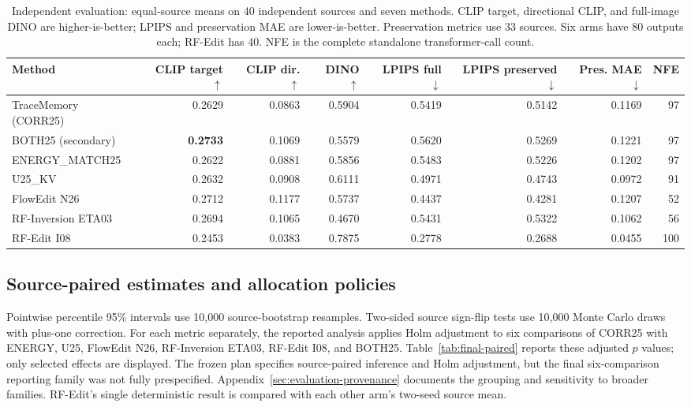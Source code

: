 \begin{table}[t]
\centering\small
\caption{Independent evaluation: equal-source means on 40 independent sources and seven methods. CLIP target, directional CLIP, and full-image DINO are higher-is-better; LPIPS and preservation MAE are lower-is-better. Preservation metrics use 33 sources. Six arms have 80 outputs each; RF-Edit has 40. NFE is the complete standalone transformer-call count.}
\label{tab:final-means}
\setlength{\tabcolsep}{5pt}
\begin{tabular}{lrrrrrrr}
\toprule
Method & CLIP target $\uparrow$ & CLIP dir. $\uparrow$ & DINO $\uparrow$ & LPIPS full $\downarrow$ & LPIPS preserved $\downarrow$ & Pres. MAE $\downarrow$ & NFE\\
\midrule
TraceMemory (CORR25) & 0.2629 & 0.0863 & 0.5904 & 0.5419 & 0.5142 & 0.1169 & 97\\
BOTH25 (secondary) & \textbf{0.2733} & 0.1069 & 0.5579 & 0.5620 & 0.5269 & 0.1221 & 97\\
ENERGY\_MATCH25 & 0.2622 & 0.0881 & 0.5856 & 0.5483 & 0.5226 & 0.1202 & 97\\
U25\_KV & 0.2632 & 0.0908 & 0.6111 & 0.4971 & 0.4743 & 0.0972 & 91\\
FlowEdit N26 & 0.2712 & 0.1177 & 0.5737 & 0.4437 & 0.4281 & 0.1207 & 52\\
RF-Inversion ETA03 & 0.2694 & 0.1065 & 0.4670 & 0.5431 & 0.5322 & 0.1062 & 56\\
RF-Edit I08 & 0.2453 & 0.0383 & 0.7875 & 0.2778 & 0.2688 & 0.0455 & 100\\
\bottomrule
\end{tabular}
\end{table}

\subsection{Source-paired estimates and allocation policies}
Pointwise percentile 95\% intervals use 10,000 source-bootstrap resamples. Two-sided source sign-flip tests use 10,000 Monte Carlo draws with plus-one correction. For each metric separately, the reported analysis applies Holm adjustment to six comparisons of CORR25 with ENERGY, U25, FlowEdit N26, RF-Inversion ETA03, RF-Edit I08, and BOTH25. Table~\ref{tab:final-paired} reports these adjusted $p$ values; only selected effects are displayed. The frozen plan specifies source-paired inference and Holm adjustment, but the final six-comparison reporting family was not fully prespecified. Appendix~\ref{sec:evaluation-provenance} documents the grouping and sensitivity to broader families. RF-Edit's single deterministic result is compared with each other arm's two-seed source mean.

